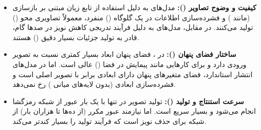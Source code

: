 \documentclass{article}
\begin{document}
\begin{itemize}
	\item \textbf{کیفیت و وضوح تصاویر ():}
	مدل‌های  به دلیل استفاده از تابع زیان مبتنی بر بازسازی (مانند ) و فشرده‌سازی اطلاعات در یک گلوگاه () منفرد، معمولاً تصاویری محو () تولید می‌کنند. در مقابل، مدل‌های  به دلیل فرآیند تدریجی کاهش نویز در صدها گام، قادر به تولید جزئیات بسیار دقیق () هستند.
	
	\item \textbf{ساختار فضای پنهان ():}
	در ، فضای پنهان ابعاد بسیار کمتری نسبت به تصویر ورودی دارد و برای کارهایی مانند پیمایش در فضا () عالی است. اما در مدل‌های انتشار استاندارد، فضای متغیرهای پنهان دارای ابعادی برابر با تصویر اصلی است و فشرده‌سازی ابعادی (بدون لایه‌های میانی ) رخ نمی‌دهد.
	
	\item \textbf{سرعت استنتاج و تولید ():}
	تولید تصویر در  تنها با یک بار عبور از شبکه رمزگشا انجام می‌شود و بسیار سریع است. اما  نیازمند عبور مکرر (از ده‌ها تا هزاران بار) از شبکه برای حذف نویز است که فرآیند تولید را بسیار کندتر می‌کند.
\end{itemize}
\end{document}
